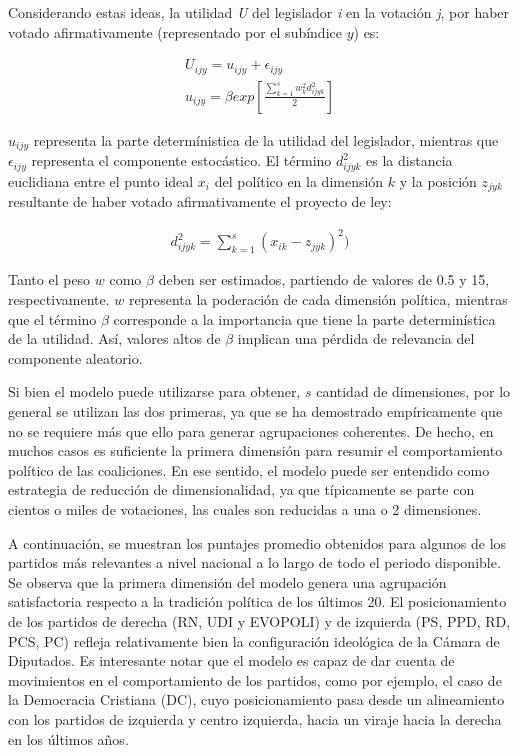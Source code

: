 \documentclass[
  12pt,
]{article}
\begin{document}
Considerando estas ideas, la utilidad \emph{U} del legislador \emph{i}
en la votación \emph{j}, por haber votado afirmativamente (representado
por el subíndice \(y\)) es:

\begin{align}
\label{formula_poole}
U_{ijy} = u_{ijy} + \epsilon_{ijy} \\
u_{ijy} = \beta exp[\frac{\sum_{k=1}^{s}w_{k}^2d_{ijyk}^2 }{2}] 
\end{align}

\(u_{ijy}\) representa la parte determínistica de la utilidad del
legislador, mientras que \(\epsilon_{ijy}\) representa el componente
estocástico. El término \(d_{ijyk}^2\) es la distancia euclidiana entre
el punto ideal \(x_i\) del político en la dimensión \(k\) y la posición
\(z_{jyk}\) resultante de haber votado afirmativamente el proyecto de
ley:

\begin{align}
\label{formula_distancia}
d_{ijyk}^2 = \sum_{k=1}^{s}(x_{ik} - z_{jyk})^2)
\end{align}

Tanto el peso \(w\) como \(\beta\) deben ser estimados, partiendo de
valores de 0.5 y 15, respectivamente. \(w\) representa la poderación de
cada dimensión política, mientras que el término \(\beta\) corresponde a
la importancia que tiene la parte determinística de la utilidad. Así,
valores altos de \(\beta\) implican una pérdida de relevancia del
componente aleatorio.

Si bien el modelo puede utilizarse para obtener, \(s\) cantidad de
dimensiones, por lo general se utilizan las dos primeras, ya que se ha
demostrado empíricamente que no se requiere más que ello para generar
agrupaciones coherentes. De hecho, en muchos casos es suficiente la
primera dimensión para resumir el comportamiento político de las
coaliciones. En ese sentido, el modelo puede ser entendido como
estrategia de reducción de dimensionalidad, ya que típicamente se parte
con cientos o miles de votaciones, las cuales son reducidas a una o 2
dimensiones.

A continuación, se muestran los puntajes promedio obtenidos para algunos
de los partidos más relevantes a nivel nacional a lo largo de todo el
periodo disponible. Se observa que la primera dimensión del modelo
genera una agrupación satisfactoria respecto a la tradición política de
los últimos 20. El posicionamiento de los partidos de derecha (RN, UDI y
EVOPOLI) y de izquierda (PS, PPD, RD, PCS, PC) refleja relativamente
bien la configuración ideológica de la Cámara de Diputados. Es
interesante notar que el modelo es capaz de dar cuenta de movimientos en
el comportamiento de los partidos, como por ejemplo, el caso de la
Democracia Cristiana (DC), cuyo posicionamiento pasa desde un
alineamiento con los partidos de izquierda y centro izquierda, hacia un
viraje hacia la derecha en los últimos años.
\end{document}

